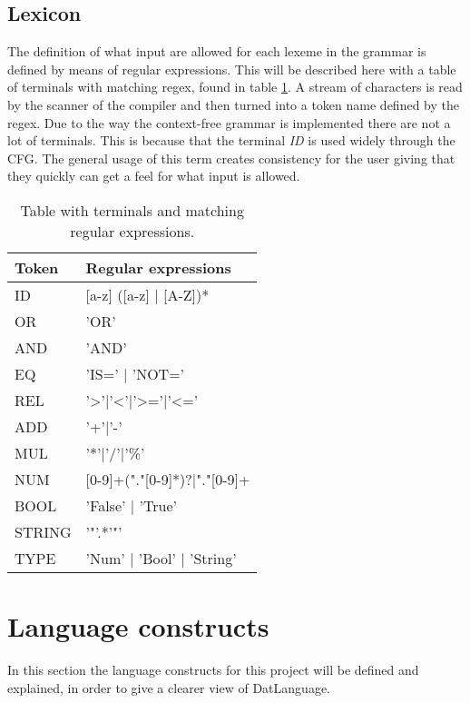 \subsection{Lexicon}
The definition of what input are allowed for each lexeme in the grammar is defined by means of regular expressions. This will be described here with a table of terminals with matching regex, found in table \ref{fig:Lexicon}. A stream of characters is read by the scanner of the compiler and then turned into a token name defined by the regex.
Due to the way the context-free grammar is implemented there are not a lot of terminals. This is because that the terminal \emph{ID} is used widely through the CFG. The general usage of this term creates consistency for the user giving that they quickly can get a feel for what input is allowed. 

\begin{table}[]
\centering
\begin{tabular}{|l|l|}
\hline
Token & Regular expressions                \\ \hline
ID       & {[}a-z{]} ({[}a-z{]} | {[}A-Z{]})* \\ \hline
OR		 & 'OR'								  \\ \hline
AND		 & 'AND'							  \\ \hline
EQ		 & 'IS=' | 'NOT='					  \\ \hline
REL		 & '>'|'<'|'>='|'<='					  \\ \hline
ADD		 & '+'|'-'							  \\ \hline
MUL		 & '*'|'/'|'\%'						  \\ \hline
NUM		 & [0-9]+("."[0-9]*)?|"."[0-9]+		\\ \hline
BOOL 	 & 'False' | 'True'					  \\ \hline
STRING 	 & '"'.*'"'						      \\ \hline
TYPE     & 'Num' | 'Bool' | 'String'            \\ \hline


\end{tabular}
\caption{Table with terminals and matching regular expressions.}
\label{fig:Lexicon}
\end{table}

\section{Language constructs}
In this section the language constructs for this project will be defined and explained, in order to give a clearer view of DatLanguage.

